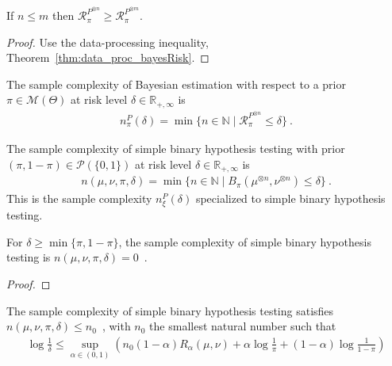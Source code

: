 \begin{lemma}
  \label{lem:bayesRisk_mono_prod}
  If $n \le m$ then $\mathcal R_\pi^{P^{\otimes n}} \ge \mathcal R_\pi^{P^{\otimes m}}$.
\end{lemma}

\begin{proof}%
{}
Use the data-processing inequality, Theorem~\ref{thm:data_proc_bayesRisk}.
\end{proof}


\begin{definition}
  \label{def:priorSampleComplexity}
  The sample complexity of Bayesian estimation with respect to a prior $\pi \in \mathcal M(\Theta)$ at risk level $\delta \in \mathbb{R}_{+,\infty}$ is
  \begin{align*}
  n_\pi^P(\delta) = \min \{n \in \mathbb{N} \mid \mathcal R_\pi^{P^{\otimes n}} \le \delta\} \: .
  \end{align*}
\end{definition}


\begin{definition}
  \label{def:binaryPriorSampleComplexity}
  The sample complexity of simple binary hypothesis testing with prior $(\pi, 1 - \pi) \in \mathcal P(\{0, 1\})$ at risk level $\delta \in \mathbb{R}_{+, \infty}$ is
  \begin{align*}
  n(\mu, \nu, \pi, \delta) = \min\{n \in \mathbb{N} \mid B_\pi(\mu^{\otimes n}, \nu^{\otimes n}) \le \delta\} \: .
  \end{align*}
  This is the sample complexity $n_\xi^P(\delta)$ specialized to simple binary hypothesis testing.
\end{definition}


\begin{lemma}
  \label{lem:binaryPriorSampleComplexity_eq_zero}
  For $\delta \ge \min\{\pi, 1 - \pi\}$, the sample complexity of simple binary hypothesis testing is
  $n(\mu, \nu, \pi, \delta) = 0$~.
\end{lemma}

\begin{proof}
\end{proof}


\begin{lemma}
  \label{lem:binaryPriorSampleComplexity_le_renyi}
  The sample complexity of simple binary hypothesis testing satisfies $n(\mu, \nu, \pi, \delta) \le n_0$~, with $n_0$ the smallest natural number such that
  \begin{align*}
  \log\frac{1}{\delta}
  \le \sup_{\alpha \in (0,1)} \left( n_0 (1 - \alpha)R_\alpha(\mu, \nu) + \alpha\log\frac{1}{\pi} + (1 - \alpha)\log\frac{1}{1 - \pi} \right)
  \end{align*}
\end{lemma}

